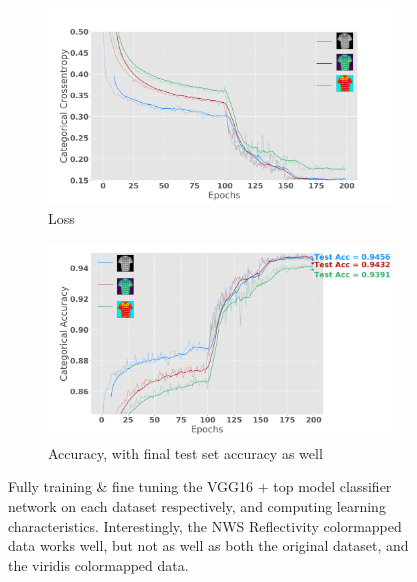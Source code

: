 \begin{figure}[h]
	\centering
	\begin{subfigure}[b]{\textwidth}
		\includegraphics[width=\textwidth]{./thesis_code/plots/20190425_200epoch_finetuning_mnistfashion_loss.png}
		\caption{Loss}
		\label{fig:classifying_longtraining_finetuning_loss}
	\end{subfigure}
	\begin{subfigure}[b]{\textwidth}
		\includegraphics[width=\textwidth]{./thesis_code/plots/20190425_200epoch_finetuning_mnistfashion.png}
		\caption{Accuracy, with final test set accuracy as well}
		\label{fig:classifying_longtraining_finetuning_acc}
	\end{subfigure}
	\caption{Fully training \& fine tuning the VGG16 + top model classifier network on each dataset respectively, and computing learning characteristics. Interestingly, the NWS Reflectivity colormapped data works well, but not as well as both the original dataset, and the viridis colormapped data.}
	\label{fig:classifying_longtraining_finetuning}
\end{figure}

